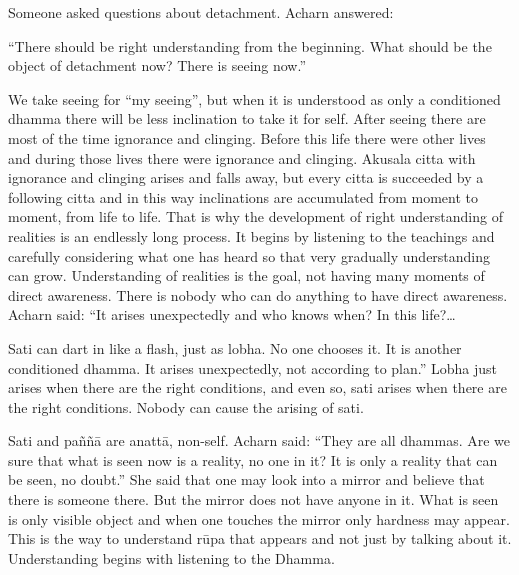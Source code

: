 {{{{Someone asked questions about
detachment. Acharn answered:

``There should be right understanding from the beginning. What should be
the object of detachment now? There is seeing now.''

We take seeing for ``my seeing'', but
when it is understood as only a conditioned dhamma there will be less
inclination to take it for self. After seeing there are most of the time
ignorance and clinging. Before this life there were other lives and
during those lives there were ignorance and clinging. Akusala citta with
ignorance and clinging arises and falls away, but every citta is
succeeded by a following citta and in this way inclinations are
accumulated from moment to moment, from life to life. That is why the
development of right understanding of realities is an endlessly long
process. It begins by listening to the teachings and carefully
considering what one has heard so that very gradually understanding can
grow. Understanding of realities is the goal, not having many moments of
direct awareness. There is nobody who can do anything to have direct
awareness. Acharn said: ``It arises unexpectedly and who knows when? In
this life?\ldots{Sati can dart in like a flash, just as lobha. No one
chooses it. It is another conditioned dhamma. It arises unexpectedly,
not according to plan.'' Lobha just arises when there are the right
conditions, and even so, sati arises when there are the right
conditions. Nobody can cause the arising of sati. 

Sati and paññā are anattā, non-self.
Acharn said: ``They are all dhammas. Are we sure that what is seen now
is a reality, no one in it? It is only a reality that can be seen, no
doubt.'' She said that one may look into a mirror and believe that there
is someone there. But the mirror does not have anyone in it. What is
seen is only visible object and when one touches the mirror only
hardness may appear. This is the way to understand rūpa that appears and
not just by talking about it. Understanding begins with listening to the
Dhamma. 

}}}}}
